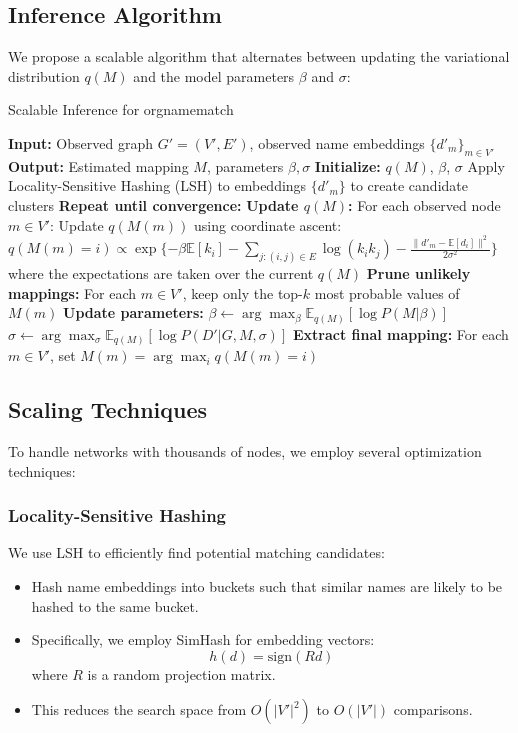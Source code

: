 \documentclass[12pt]{article}
\begin{document}
\subsection{Inference Algorithm}
We propose a scalable algorithm that alternates between updating the variational distribution $q(M)$ and the model parameters $\beta$ and $\sigma$:

\begin{algorithm}
\caption{Scalable Inference for orgnamematch}
\begin{algorithmic}[1]
\State \textbf{Input:} Observed graph $G' = (V', E')$, observed name embeddings $\{d'_m\}_{m \in V'}$
\State \textbf{Output:} Estimated mapping $M$, parameters $\beta, \sigma$
\State \textbf{Initialize:} $q(M)$, $\beta$, $\sigma$
\State Apply Locality-Sensitive Hashing (LSH) to embeddings $\{d'_m\}$ to create candidate clusters
\State \textbf{Repeat until convergence:}
\State \quad \textbf{Update $q(M)$:}
\State \quad \quad For each observed node $m \in V'$:
\State \quad \quad \quad Update $q(M(m))$ using coordinate ascent:
\State \quad \quad \quad $q(M(m) = i) \propto \exp\{-\beta \mathbb{E}[k_i] - \sum_{j:(i,j) \in E} \log(k_i k_j) - \frac{\|d'_m - \mathbb{E}[d_i]\|^2}{2\sigma^2}\}$
\State \quad \quad \quad where the expectations are taken over the current $q(M)$
\State \quad \textbf{Prune unlikely mappings:}
\State \quad \quad For each $m \in V'$, keep only the top-$k$ most probable values of $M(m)$
\State \quad \textbf{Update parameters:}
\State \quad \quad $\beta \leftarrow \arg\max_\beta \mathbb{E}_{q(M)}[\log P(M|\beta)]$
\State \quad \quad $\sigma \leftarrow \arg\max_\sigma \mathbb{E}_{q(M)}[\log P(D'|G, M, \sigma)]$
\State \textbf{Extract final mapping:}
\State \quad For each $m \in V'$, set $M(m) = \arg\max_i q(M(m) = i)$
\end{algorithmic}
\end{algorithm}

\subsection{Scaling Techniques}
To handle networks with thousands of nodes, we employ several optimization techniques:

\subsubsection{Locality-Sensitive Hashing}
We use LSH to efficiently find potential matching candidates:

\begin{itemize}
\item Hash name embeddings into buckets such that similar names are likely to be hashed to the same bucket.
\item Specifically, we employ SimHash for embedding vectors:
$$h(d) = \text{sign}(Rd)$$
where $R$ is a random projection matrix.
\item This reduces the search space from $O(|V'|^2)$ to $O(|V'|)$ comparisons.
\end{itemize}
\end{document}
